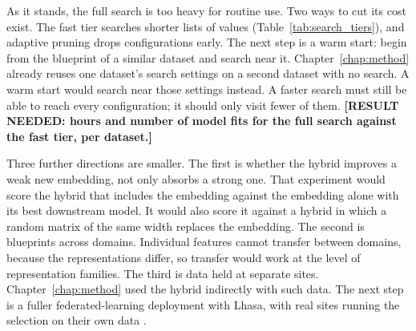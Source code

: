 As it stands, the full search is too heavy for routine use. Two ways to cut its cost exist. The fast tier searches shorter lists of values (Table~\ref{tab:search_tiers}), and adaptive pruning drops configurations early. The next step is a warm start: begin from the blueprint of a similar dataset and search near it. Chapter~\ref{chap:method} already reuses one dataset's search settings on a second dataset with no search. A warm start would search near those settings instead. A faster search must still be able to reach every configuration; it should only visit fewer of them. \textbf{[RESULT NEEDED: hours and number of model fits for the full search against the fast tier, per dataset.]}

Three further directions are smaller. The first is whether the hybrid improves a weak new embedding, not only absorbs a strong one. That experiment would score the hybrid that includes the embedding against the embedding alone with its best downstream model. It would also score it against a hybrid in which a random matrix of the same width replaces the embedding. The second is blueprints across domains. Individual features cannot transfer between domains, because the representations differ, so transfer would work at the level of representation families. The third is data held at separate sites. Chapter~\ref{chap:method} used the hybrid indirectly with such data. The next step is a fuller federated-learning deployment with Lhasa, with real sites running the selection on their own data \citep{McMahan2017}.

